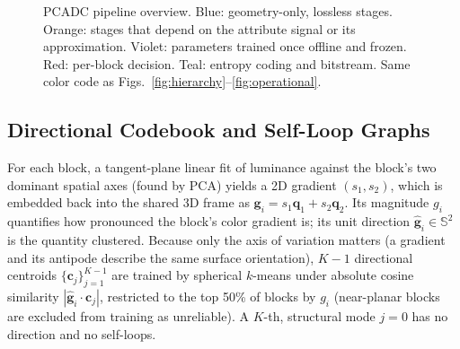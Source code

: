 \documentclass[conference]{IEEEtran}
\begin{document}
\begin{figure}[t]
\centering
{}
\caption{PCADC pipeline overview. Blue: geometry-only, lossless stages. Orange: stages that
depend on the attribute signal or its approximation. Violet: parameters trained once offline and
frozen. Red: per-block decision. Teal: entropy coding and bitstream. Same color code as
Figs.~\ref{fig:hierarchy}--\ref{fig:operational}.}
\label{fig:pipeline}
\end{figure}

\subsection{Directional Codebook and Self-Loop Graphs}
For each block, a tangent-plane linear fit of luminance against the block's two dominant
spatial axes (found by PCA) yields a 2D gradient $(s_1,s_2)$, which is embedded back into the
shared 3D frame as $\mathbf{g}_i = s_1\mathbf{q}_1 + s_2\mathbf{q}_2$. Its magnitude $g_i$
quantifies how pronounced the block's color gradient is; its unit direction
$\hat{\mathbf{g}}_i \in \mathbb{S}^2$ is the quantity clustered. Because only the axis of
variation matters (a gradient and its antipode describe the same surface orientation),
$K-1$ directional centroids $\{\mathbf{c}_j\}_{j=1}^{K-1}$ are trained by spherical $k$-means
under absolute cosine similarity $|\hat{\mathbf{g}}_i\cdot\mathbf{c}_j|$, restricted to the top
50\% of blocks by $g_i$ (near-planar blocks are excluded from training as unreliable). A
$K$-th, structural mode $j{=}0$ has no direction and no self-loops.
\end{document}
